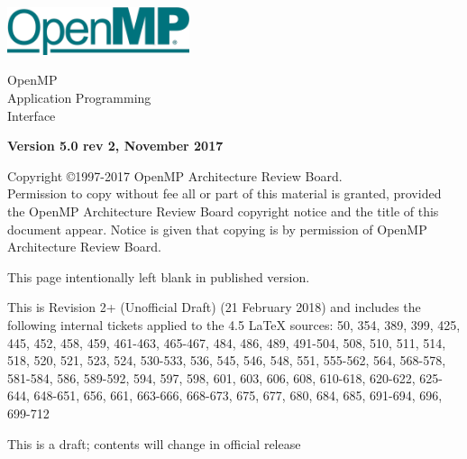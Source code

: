 
  \begin{titlepage}
    \begin{flushleft}
     \hspace{-6em} \includegraphics[width=0.4\textwidth]{openmp-logo.png}
    \end{flushleft}

    \begin{adjustwidth}{-0.75in}{0in}
    \begin{center}
      \Huge
      \textsf{OpenMP\\Application Programming\\Interface}

      \vspace{0.5in}\textsf{    }\vspace{-0.7in}
      \normalsize

      \vspace{1.0in}

      \textbf{Version 5.0 rev 2, November 2017}
    \end{center}
    \end{adjustwidth}

    \vspace{3.0in}

\begin{adjustwidth}{0pt}{1em}\setlength{\parskip}{0.25\baselineskip}%
Copyright \copyright 1997-2017 OpenMP Architecture Review Board.\\
Permission to copy without fee all or part of this material is granted,
provided the OpenMP Architecture Review Board copyright notice and
the title of this document appear. Notice is given that copying is by
permission of OpenMP Architecture Review Board.\end{adjustwidth}

  \end{titlepage}


\clearpage
\thispagestyle{empty}
\phantom{a}
This page intentionally left blank in published version.

This is Revision 2+ (Unofficial Draft) (21 February 2018) and
includes the following internal tickets applied to the 4.5 LaTeX sources:
50, 354, 389, 399, 425, 445, 452, 458, 459, 461-463, 465-467, 484, 486, 489, 
491-504, 508, 510, 511, 514, 518, 520, 521, 523, 524, 530-533, 536, 545, 
546, 548, 551, 555-562, 564, 568-578, 581-584, 586, 589-592, 594, 597, 598,
601, 603, 606, 608, 610-618, 620-622, 625-644, 648-651, 656, 661, 663-666, 
668-673, 675, 677, 680, 684, 685, 691-694, 696, 699-712

This is a draft; contents will change in official release

\vfill

